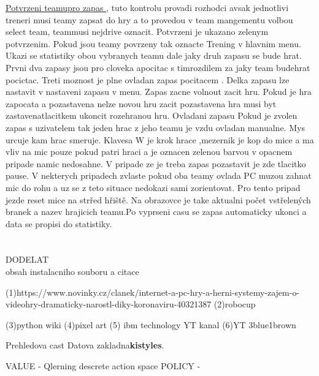 \documentclass[
  program=ainfk,
  biblatex,
  language=czech,
  figures=true,
  tables ,
  sourcecodes=true,
  glossaries=true,
  index
]{kidiplom}
\begin{document}
\underline{Potvrzeni teamupro zapas },  tuto kontrolu provadi rozhodci avsak jednotlivi treneri musi teamy zapsat do hry a to provedou v team mangementu volbou select team, teammusi nejdrive oznacit. Potvrzeni je ukazano zelenym potvrzenim. Pokud jsou teamy povrzeny tak oznacte Trening v hlavnim menu. Ukazi se statistiky obou vybranych teamu dale jaky druh zapasu se bude hrat. Prvni dva zapasy jsou pro cloveka apocitac s timrozdilem za jaky team budehrat pocictac. Treti moznost je plne ovladan zapas pocitacem . Delka zapasu lze nastavit v nastaveni zapasu v menu. Zapas zacne volnout zacit hru. Pokud je hra zapocata a pozastavena nelze novou hru zacit pozastavena hra musi byt zastavenatlacitkem ukoncit rozehranou hru.
Ovladani zapasu Pokud je zvolen zapas s uzivatelem tak jeden hrac z jeho teamu je vzdu ovladan manualne. Mys urcuje kam hrac smeruje. Klavesa W je krok hrace ,mezernik je kop do mice a ma vliv na mic pouze pokud patri hraci a je oznacen zelenou barvou v opacnem pripade namic nedosahne. V pripade ze je treba zapas pozastavit je zde tlacitko pause. V nekterych pripadech zvlaste pokud oba teamy ovlada PC muzou zahnat mic do rohu a uz se z teto situace nedokazi sami zorientovat. Pro tento pripad jezde reset mice na strřed hřiště. Na obrazovce je take aktualni počet vstřelených branek a nazev hrajicich teamu.Po vyprseni casu se zapas automaticky ukonci a data se propisi do statistiky.  
\\
\\
\\

DODELAT \\
obsah instalacniho souboru
a
citace 

(1)https://www.novinky.cz/clanek/internet-a-pc-hry-a-herni-systemy-zajem-o-videohry-dramaticky-narostl-diky-koronaviru-40321387
(2)robocup

(3)python wiki
(4)pixel art 
(5) ibm technology YT kanal
(6)YT 3blue1brown


Prehledova cast 
Datova zakladna\textbf{kistyles}.

VALUE - Qlerning descrete action space
POLICY - 




  
\end{document}
